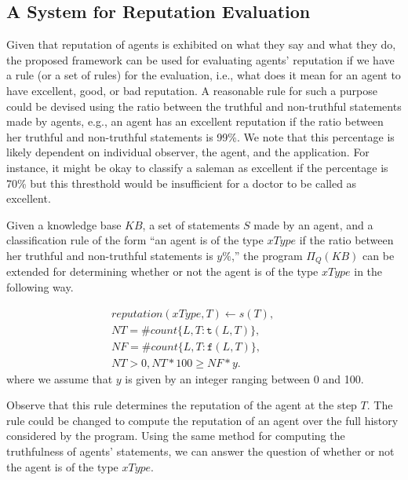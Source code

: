 \documentclass{article}
\begin{document}
%

 
\subsection{A System for Reputation Evaluation}    
Given that reputation of agents is exhibited on what they say and what they do, the proposed framework can be used for evaluating agents' reputation if we have a rule (or a set of rules) for the evaluation, i.e., what does it mean for an agent to have excellent, good, or bad reputation. A reasonable rule for such a purpose could be devised using the ratio between the truthful and non-truthful statements made by agents, e.g., an agent has an excellent reputation if the ratio between her  truthful and non-truthful statements is 99\%. We note that this percentage is likely dependent on individual observer, the agent, and the application. For instance, it might be okay to classify a saleman as excellent if the percentage is 70\% but this thresthold would be insufficient for a doctor to be called as excellent. 

Given a knowledge base $KB$, a set of statements $S$ made by an agent, and a classification rule of the form ``an agent is of the type $xType$ if the ratio  between her  truthful and non-truthful statements is $y\%$,'' the program $\Pi_Q(KB)$ can be extended for determining whether or not the agent is of the type $xType$ in the following way. 

\begin{align} 
reputation(xType, T) \leftarrow s(T),\quad\quad  \label{rep} \\
NT = \#count \{L,T : \mathtt{t}(L, T)\},  \:\: \nonumber \\
NF =  \#count \{L,T : \mathtt{f}(L, T)\}, \nonumber \\
NT > 0, NT*100  \ge NF*y.        \quad\quad \:\: \nonumber
\end{align}     
where we assume that $y$ is given by an integer ranging between 0 and 100. 

Observe that this rule determines the reputation of the agent at the step $T$. The rule could be changed to compute the reputation of an agent over the full history considered by the program. Using the same method for computing the truthfulness of agents' statements, we can 
answer the question of whether or not the agent is of the type $xType$. 
\end{document}
